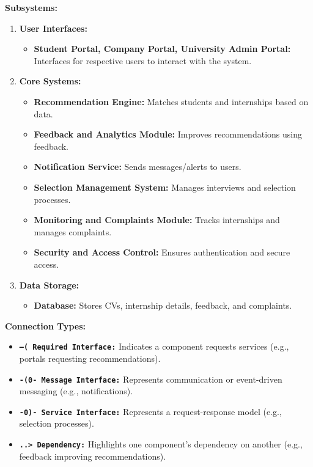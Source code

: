 \textbf{Subsystems:}
\begin{enumerate}
    \item \textbf{User Interfaces:}
    \begin{itemize}
        \item \textbf{Student Portal, Company Portal, University Admin Portal:} Interfaces for respective users to interact with the system.
    \end{itemize}

    \item \textbf{Core Systems:}
    \begin{itemize}
        \item \textbf{Recommendation Engine:} Matches students and internships based on data.
        \item \textbf{Feedback and Analytics Module:} Improves recommendations using feedback.
        \item \textbf{Notification Service:} Sends messages/alerts to users.
        \item \textbf{Selection Management System:} Manages interviews and selection processes.
        \item \textbf{Monitoring and Complaints Module:} Tracks internships and manages complaints.
        \item \textbf{Security and Access Control:} Ensures authentication and secure access.
    \end{itemize}

    \item \textbf{Data Storage:}
    \begin{itemize}
        \item \textbf{Database:} Stores CVs, internship details, feedback, and complaints.
    \end{itemize}
\end{enumerate}

\textbf{Connection Types:}
\begin{itemize}
    \item \textbf{\texttt{--( Required Interface:}} Indicates a component requests services (e.g., portals requesting recommendations).
    \item \textbf{\texttt{-(0- Message Interface:}} Represents communication or event-driven messaging (e.g., notifications).
    \item \textbf{\texttt{-0)- Service Interface:}} Represents a request-response model (e.g., selection processes).
    \item \textbf{\texttt{..> Dependency:}} Highlights one component's dependency on another (e.g., feedback improving recommendations).
\end{itemize}

